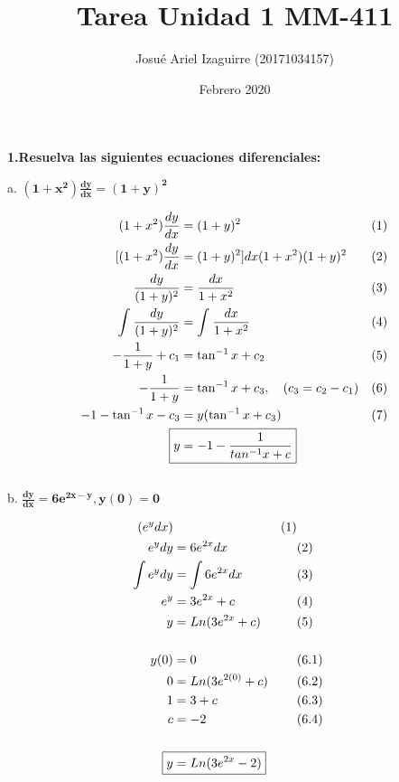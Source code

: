 \documentclass{article}
\title{Tarea Unidad 1 MM-411}
\author{Josué Ariel Izaguirre (20171034157)}
\date{Febrero 2020}
\begin{document}
    \maketitle
    \begin{flushleft}
        \textbf{1.Resuelva las siguientes ecuaciones diferenciales:} \break
        
        
        \hspace{10mm} a. $
            \boldsymbol{\left( 1+x^2 \right) \frac{dy}{dx} = \left(1+y \right)^2}
            $  \break

                \begin{align*}
                    ( 1+x^2 ) \frac{dy}{dx} & = (1+y )^2  &&\text{(1)}\\
                    [ ( 1+x^2 ) \frac{dy}{dx} & = (1+y)^2 ] {dx}{(1+x^2)(1+y)^2} &&\text{(2)}\\
                    \frac{dy}{(1+y)^2} & = \frac{dx}{1+x^2} &&\text{(3)}\\
                    \int_{}^{} \frac{dy}{(1+y)^2} & = \int_{}^{} \frac{dx}{1+x^2} &&\text{(4)}\\
                    -\frac{1}{1+y} + c_1 & = \tan ^ {-1} {x} + c_2 &&\text{(5)}\\
                    -\frac{1}{1+y} & = \tan ^ {-1} {x} + c_3, \quad (c_3 = c_2 - c_1) &&\text{(6)} \\
                    -1 - \tan ^ {-1} {x} - c_3 & = y ( \tan ^ {-1} {x} + c_{3} ) &&\text{(7)} \\
                    \Aboxed{y & = -1 - \frac{1}{tan ^{-1}x + c}}
                \end{align*}\\

        \hspace{10mm} b. $
            \boldsymbol{\frac{dy}{dx} = 6e^{2x-y} , y(0) = 0}
            $  \break

            \begin{align*}
                [ \frac{dy}{dx} & = 6\frac{e^{2x}}{e^y} ] (e^y dx) && \text{(1)} \\
                e^y dy & = 6e^{2x} dx && \text{(2)} \\
                \int e^y dy & = \int 6e^{2x} dx && \text{(3)} \\
                e^y & = 3e^{2x} + c && \text{(4)} \\
                y & = Ln(3e^{2x} + c) && \text{(5)} \\
                \\
                y(0) & = 0 && \text{(6.1)} \\
                0 & = Ln(3e^{2(0)} + c) && \text{(6.2)} \\
                1 & = 3 + c && \text{(6.3)} \\
                c & = -2 && \text{(6.4)}\\
                \\
                \Aboxed{y &= Ln(3e^{2x}-2)}
            \end{align*}


\end{flushleft}
\end{document}
